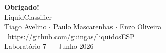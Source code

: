 \documentclass[aspectratio=169, 11pt]{beamer}
\begin{document}
\begin{frame}[plain]
  \begin{center}
    \vspace{2cm}
    {\Huge\textbf{Obrigado!}}\\
    \vspace{1cm}
    {\Large LiquidClassifier}\\
    \vspace{0.5cm}
    {\large Tiago Avelino $\cdot$ Paulo Mascarenhas $\cdot$ Enzo Oliveira}\\
    \vspace{1cm}
    \faGithub\ \url{https://github.com/guingas/liquidosESP}\\
    \vspace{1cm}
    {\small Laboratório 7 — Junho 2026}
  \end{center}
\end{frame}
\end{document}
